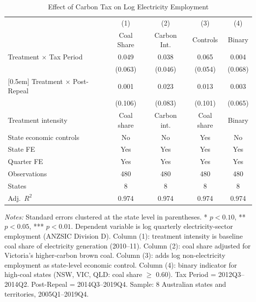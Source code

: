 \begin{table}[H]
\centering
\caption{Effect of Carbon Tax on Log Electricity Employment}
\begin{threeparttable}
\begin{tabular}{lcccc}
\toprule
 & (1) & (2) & (3) & (4) \\
 & Coal Share & Carbon Int. & Controls & Binary \\
\midrule
Treatment $\times$ Tax Period & 0.049 & 0.038 & 0.065 & 0.004 \\
 & (0.063) & (0.046) & (0.054) & (0.068) \\{}
[0.5em]
Treatment $\times$ Post-Repeal & 0.001 & 0.023 & 0.013 & 0.003 \\
 & (0.106) & (0.083) & (0.101) & (0.065) \\
\midrule
Treatment intensity & Coal share & Carbon int. & Coal share & Binary \\
State economic controls & No & No & Yes & No \\
State FE & Yes & Yes & Yes & Yes \\
Quarter FE & Yes & Yes & Yes & Yes \\
Observations & 480 & 480 & 480 & 480 \\
States & 8 & 8 & 8 & 8 \\
Adj.\ $R^2$ & 0.974 & 0.974 & 0.974 & 0.974 \\
\bottomrule
\end{tabular}
\begin{tablenotes}[flushleft]
\small
\item \textit{Notes:} Standard errors clustered at the state level in parentheses. * $p<0.10$, ** $p<0.05$, *** $p<0.01$. Dependent variable is log quarterly electricity-sector employment (ANZSIC Division D). Column (1): treatment intensity is baseline coal share of electricity generation (2010--11). Column (2): coal share adjusted for Victoria's higher-carbon brown coal. Column (3): adds log non-electricity employment as state-level economic control. Column (4): binary indicator for high-coal states (NSW, VIC, QLD: coal share $\geq$ 0.60). Tax Period = 2012Q3--2014Q2. Post-Repeal = 2014Q3--2019Q4. Sample: 8 Australian states and territories, 2005Q1--2019Q4.
\end{tablenotes}
\end{threeparttable}
\label{tab:main}
\end{table}

